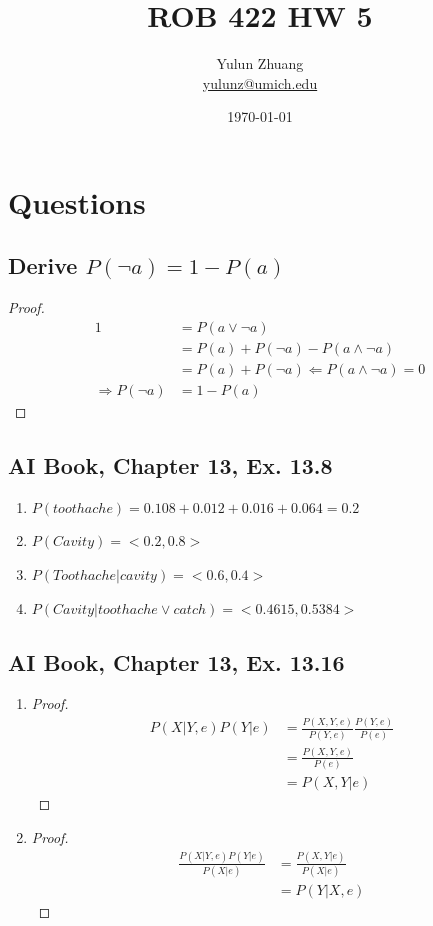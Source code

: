 \documentclass{article}
\title{ROB 422 HW 5}
\author{Yulun Zhuang \\ \href{mailto:yulunz@umich.edu}{yulunz@umich.edu}}
\date{\today}
\theoremstyle{definition} %
\begin{document}
\maketitle

\section*{Questions}
\subsection*{Derive $P(\neg a) = 1-P(a)$}
\begin{proof}
    \begin{align*}
        1 &= P(a\lor \neg a)\\
        &= P(a) + P(\neg a) - P(a\land \neg a)\\
        &= P(a) + P(\neg a) \Leftarrow P(a\land \neg a) = 0\\
        \Rightarrow P(\neg a) &= 1-P(a)
    \end{align*}
\end{proof}

\subsection*{AI Book, Chapter 13, Ex. 13.8}
\begin{enumerate}[label=\alph*.]
    \item $P(toothache) = 0.108 + 0.012 + 0.016 + 0.064 = 0.2$
    \item $P(Cavity) = <0.2, 0.8>$
    \item $P(Toothache | cavity) = <0.6, 0.4>$
    \item $P(Cavity | toothache \lor catch) = <0.4615, 0.5384>$
\end{enumerate}

\subsection*{AI Book, Chapter 13, Ex. 13.16}

\begin{enumerate}[label=\alph*.]
    \item 
    \begin{proof}
        \begin{align*}
            P(X|Y, e) P(Y|e) &= \frac{P(X, Y, e)}{P(Y, e)} \frac{P(Y, e)}{P(e)} \\
            &= \frac{P(X, Y, e)}{P(e)} \\
            &= P(X, Y | e)
        \end{align*}
    \end{proof}
    \item 
    \begin{proof}
        \begin{align*}
            \frac{P(X|Y, e)P(Y | e)}{P(X|e)} &= \frac{P(X, Y | e)}{P(X|e)}\\
            &= P(Y|X,e)
        \end{align*}
    \end{proof}
\end{enumerate}
\end{document}

